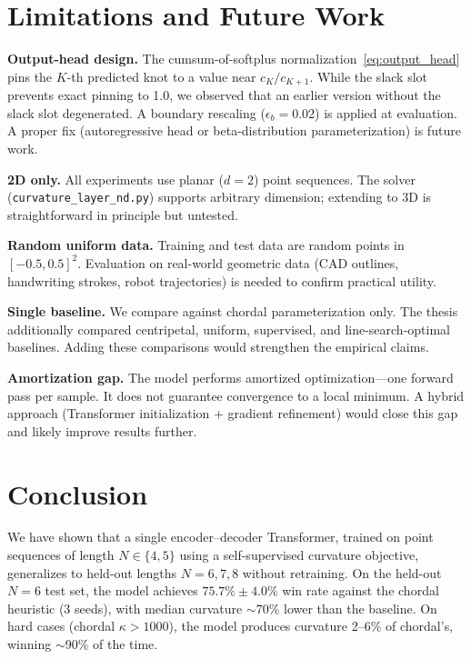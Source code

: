 \documentclass[11pt, a4paper]{article}
\begin{document}
\section{Limitations and Future Work}
\label{sec:limitations}

\textbf{Output-head design.}
The cumsum-of-softplus normalization~\eqref{eq:output_head} pins the
$K$-th predicted knot to a value near $c_K / c_{K+1}$. While the slack
slot prevents exact pinning to 1.0, we observed that an earlier version
without the slack slot degenerated. A boundary rescaling
($\epsilon_b = 0.02$) is applied at evaluation. A proper fix
(autoregressive head or beta-distribution parameterization) is future work.

\textbf{2D only.}
All experiments use planar ($d = 2$) point sequences. The solver
(\texttt{curvature\_layer\_nd.py}) supports arbitrary dimension; extending
to 3D is straightforward in principle but untested.

\textbf{Random uniform data.}
Training and test data are random points in $[-0.5, 0.5]^2$. Evaluation
on real-world geometric data (CAD outlines, handwriting strokes, robot
trajectories) is needed to confirm practical utility.

\textbf{Single baseline.}
We compare against chordal parameterization only. The thesis additionally
compared centripetal, uniform, supervised, and line-search-optimal
baselines. Adding these comparisons would strengthen the empirical claims.

\textbf{Amortization gap.}
The model performs amortized optimization---one forward pass per sample.
It does not guarantee convergence to a local minimum. A hybrid approach
(Transformer initialization + gradient refinement) would close this gap
and likely improve results further.


\section{Conclusion}
\label{sec:conclusion}

We have shown that a single encoder--decoder Transformer, trained on
point sequences of length $N \in \{4, 5\}$ using a self-supervised
curvature objective, generalizes to held-out lengths $N = 6, 7, 8$
without retraining. On the held-out $N = 6$ test set, the model
achieves $75.7\% \pm 4.0\%$ win rate against the chordal heuristic
(3 seeds), with median curvature $\sim$70\% lower than the baseline.
On hard cases (chordal $\kappa > 1000$), the model produces curvature
2--6\% of chordal's, winning $\sim$90\% of the time.
\end{document}
